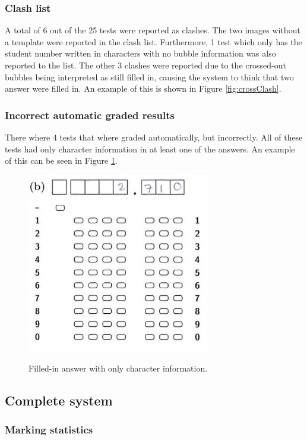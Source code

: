 \subsubsection{Clash list}

A total of 6 out of the 25 tests were reported as clashes. The two images without a template were reported in the clash list. Furthermore, 1 test which only has the student number written in characters with no bubble information was also reported to the list. The other 3 clashes were reported due to the crossed-out bubbles being interpreted as still filled in, causing the system to think that two answer were filled in. An example of this is shown in Figure \ref{fig:crossClash}.

\subsubsection{Incorrect automatic graded results}

There where 4 tests that where graded automatically, but incorrectly. All of these tests had only character information in at least one of the answers. An example of this can be seen in Figure \ref{fig:OnlyCharacters}.

\begin{figure}
  \centering
  \includegraphics[width=8cm]{OnlyCharacters}\\
  \caption{Filled-in answer with only character information.}
  \label{fig:OnlyCharacters}
\end{figure}

\subsection{Complete system}

\subsubsection{Marking statistics}

